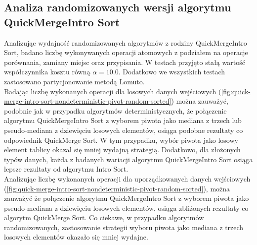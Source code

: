 \begin{figure}[]
	\centering
	
	\caption[]{}
	\label{fig:quick-merge-intro-sort-deterministic-pivot-density}
\end{figure}

\begin{figure}[]
	\centering
	
	\caption[]{}
	\label{fig:quick-merge-intro-sort-deterministic-pivot-density-sorted}
\end{figure}

\subsection{Analiza randomizowanych wersji algorytmu QuickMergeIntro Sort}
Analizując wydajność randomizowanych algorytmów z rodziny QuickMergeIntro Sort, badano liczbę wykonywanych operacji atomowych z podziałem na operacje porównania, zamiany miejsc oraz przypisania. W testach przyjęto stałą wartość współczynnika kosztu równą $\alpha = 10.0$. Dodatkowo we wszystkich testach zastosowano partycjonowanie metodą Lomuto.\\

Badając liczbę wykonanych operacji dla losowych danych wejściowych (\ref{fig:quick-merge-intro-sort-nondeterministic-pivot-random-sorted}) można zauważyć, podobnie jak w przypadku algorytmów deterministycznych, że połączenie algorytmu QuickMergeIntro Sort z wyborem piwota jako mediana z trzech lub pseudo-mediana z dziewięciu losowych elementów, osiąga podobne rezultaty co odpowiednik QuickMerge Sort. W tym przypadku, wybór piwota jako losowy element tablicy okazał się mniej wydajną strategią. Dodatkowo, dla złożonych typów danych, każda z badanych wariacji algorytmu QuickMergeIntro Sort osiąga lepsze rezultaty od algorytmu Intro Sort.\\

Analizując liczbę wykonanych operacji dla uporządkowanych danych wejściowych (\ref{fig:quick-merge-intro-sort-nondeterministic-pivot-random-sorted}), można zauważyć że połączenie algorytmu QuickMergeIntro Sort z wyborem piwota jako pseudo-mediana z dziewięciu losowych elementów, osiąga zbliżonych rezultaty co algorytm QuickMerge Sort. Co ciekawe, w przypadku algorytmów randomizowanych, zastosowanie strategii wyboru piwota jako mediana z trzech losowych elementów okazało się mniej wydajne.\\

